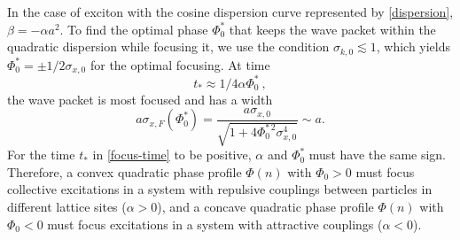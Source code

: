 %
%

In the case of exciton with the cosine dispersion curve represented by \autoref{dispersion}, $\beta = -\alpha a^2$. 
To find the optimal phase $\Phi_0^*$ that keeps the wave packet
within the quadratic dispersion while focusing it, we use the
condition $\sigma_{k, 0} \lesssim 1$, which yields
$\Phi_0^* = \pm 1/2 \sigma_{x, 0}$ for the optimal focusing. At
time
\begin{equation}
t_* \approx 1 / 4 \alpha \Phi_0^* \ , \label{focus-time}
\end{equation}
the wave packet is most
focused and has a width
%
\begin{equation}
a\sigma_{x,F} (\Phi_0^*) =  \frac{ a \sigma_{x, 0}} {\sqrt{1 + 4
\Phi_0^{*\,2} \sigma_{x, 0}^4  }} \sim a .
\label{x-focusing-Gauss}
\end{equation}
For the time $t_*$ in \autoref{focus-time} to be positive, $\alpha$ and $\Phi_0^*$ must have the same sign.
 Therefore, a convex quadratic phase profile
$\Phi(n)$ with $\Phi_0>0$ must focus collective excitations in a system with
repulsive couplings between particles in different lattice sites ($\alpha>0$), and a concave quadratic phase
profile $\Phi(n)$ with $\Phi_0<0$ must focus excitations in a system with
attractive couplings ($\alpha<0$).

